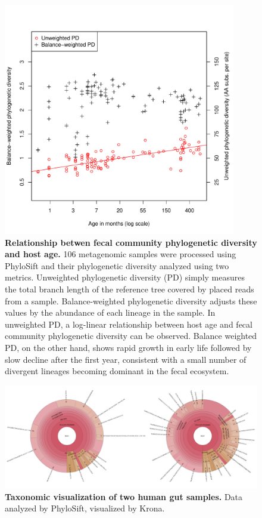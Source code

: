 \documentclass[10pt]{article}
\begin{document}
\begin{figure}[hp]
\begin{center}
\includegraphics[width=4in]{figures/phylo_diversity.pdf}
\end{center}
\caption{\textbf{Relationship betwen fecal community phylogenetic diversity and host age.} 106 metagenomic samples were processed using PhyloSift and their phylogenetic diversity analyzed using two metrics. Unweighted phylogenetic diversity (PD) simply measures the total branch length of the reference tree covered by placed reads from a sample. Balance-weighted phylogenetic diversity adjusts these values by the abundance of each lineage in the sample. In unweighted PD, a log-linear relationship between host age and fecal community phylogenetic diversity can be observed. Balance weighted PD, on the other hand, shows rapid growth in early life followed by slow decline after the first year, consistent with a small number of  divergent lineages becoming dominant in the fecal ecosystem.}
\label{fig:agediversity}
\end{figure}

\begin{figure}[hp]
\begin{center}
\includegraphics[width=6.5in]{figures/krona_two.pdf}
\end{center}
\caption{\textbf{Taxonomic visualization of two human gut samples.} Data analyzed by PhyloSift, visualized by Krona.}
\label{fig:kronaplots}
\end{figure}
\end{document}
